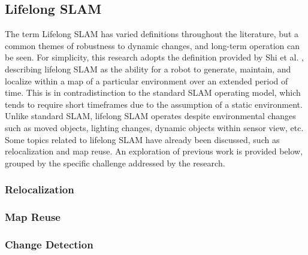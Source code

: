 \subsection{Lifelong SLAM}

The term Lifelong SLAM has varied definitions throughout the literature, but a common themes of robustness to dynamic changes, and long-term operation can be seen. For simplicity, this research adopts the definition provided by Shi et al. \cite{shiAreWeReady2020}, describing lifelong SLAM as the ability for a robot to generate, maintain, and localize within a map of a particular environment over an extended period of time. This is in contradistinction to the standard SLAM operating model, which tends to require short timeframes due to the assumption of a static environment. Unlike standard SLAM, lifelong SLAM operates despite environmental changes such as moved objects, lighting changes, dynamic objects within sensor view, etc. Some topics related to lifelong SLAM have already been discussed, such as relocalization and map reuse. An exploration of previous work is provided below, grouped by the specific challenge addressed by the research.

\subsubsection{Relocalization}
\subsubsection{Map Reuse}
\subsubsection{Change Detection}
